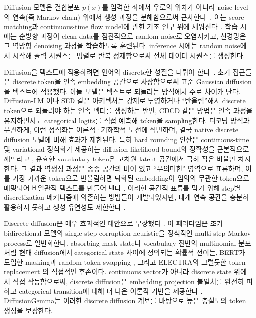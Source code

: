 \documentclass[11pt, a4paper, logo, copyright, gdm]{google}
\begin{document}
Diffusion 모델은 결합분포 $p(x)$를 엄격한 좌에서 우로의 위치가 아니라 noise level의 연속(즉 Markov chain) 위에서 생성 과정을 분해함으로써 근사한다~\citep{sohl2015deep, ho2020denoising, song2020score, holderrieth2025}. 이는 score-matching과 continuous-time flow model에 관한 기초 연구 위에 세워진다~\citep{song2019generative, song2021denoising, song2021maximum, meng2022sdedit, lipman2023flow, debortoli2021diffusion}. 학습 시에는 순방향 과정이 clean data를 점진적으로 random noise로 오염시키고, 신경망은 그 역방향 denoising 과정을 학습하도록 훈련된다. inference 시에는 random noise에서 시작해 출력 시퀀스를 병렬로 반복 정제함으로써 전체 데이터 시퀀스를 생성한다.


Diffusion을 텍스트에 적용하려면 언어의 discrete한 성질을 다뤄야 한다~\citep{yi2024diffusion}. 초기 접근들은 discrete token을 연속 embedding 공간으로 사상함으로써 표준 Gaussian diffusion을 텍스트에 적용했다. 이들 모델은 텍스트로 되돌리는 방식에서 주로 차이가 난다. Diffusion-LM \citep{li2022diffusionlm}이나 SED \citep{strudel2022self} 같은 아키텍처는 강제로 투영하거나 ``반올림''해서 discrete token으로 되돌려야 하는 연속 벡터를 생성하는 반면, CDCD \citep{dieleman2022continuous} 같은 방법은 연속 과정을 유지하면서도 categorical logits를 직접 예측해 token을 sampling한다. 디코딩 방식과 무관하게, 이런 정식화는 이론적·기하학적 도전에 직면하며, 결국 native discrete diffusion 모델에 비해 효과가 제한된다. 특히 hard rounding 연산은 continuous-time 및 variational 정식화가 제공하는 diffusion likelihood bound의 정확성을 근본적으로 깨뜨리고 \citep{kingma2021variational}, 유효한 vocabulary token은 고차원 latent 공간에서 극히 작은 비율만 차지한다. 그 결과 역생성 과정은 종종 공간의 비어 있고 ``무의미한'' 영역으로 표류하며, 이를 가장 가까운 token으로 반올림하면 퇴화된 embedding이 임의의 무관한 token으로 매핑되어 비일관적 텍스트를 만들어 낸다 \citep{shabalin2025tencdm, meshchaninov2025cosmos}. 이러한 공간적 표류를 막기 위해 step별 discretization 메커니즘에 의존하는 방법들이 개발되었지만, 대개 연속 공간을 충분히 활용하지 못하고 생성 유연성도 제한한다 \citep{hu2026elf}.

Discrete diffusion은 매우 효과적인 대안으로 부상했다 \citep{austin2021structured, sahoo2024simple, lou2024discrete, zhao2024unified}. 이 패러다임은 초기 bidirectional 모델의 single-step corruption heuristic을 정식적인 multi-step Markov process로 일반화한다. absorbing mask state나 vocabulary 전반의 multinomial 분포처럼 현대 diffusion에서 categorical state 사이에 정의되는 확률적 전이는, BERT가 도입한 masking과 random token swapping \citep{devlin2019bert, liu2019roberta, sanh2019distilbert}, 그리고 ELECTRA의 그럴듯한 token replacement \citep{clark2020electra}의 직접적인 후손이다. continuous vector가 아니라 discrete state 위에서 직접 작동함으로써, discrete diffusion은 embedding projection 불일치를 완전히 피하고 categorical transition에 대해 더 나은 이론적 기반을 제공한다 \citep{gat2024discrete}. DiffusionGemma는 이러한 discrete diffusion 계보를 바탕으로 높은 충실도의 token 생성을 보장한다.
\end{document}
